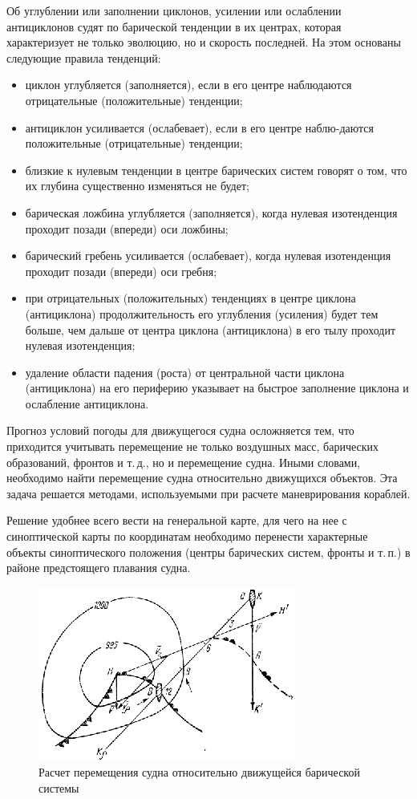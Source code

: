 \documentclass[a4paper, 12pt, twoside, final, book, russian, fittopage, cyremdash, openright]{ncc}
\begin{document}
Об углублении или заполнении циклонов, усилении или ослаблении
антициклонов судят по барической тенденции в их центрах, которая
характеризует не только эволюцию, но и скорость последней. На этом
основаны следующие правила тенденций:

\begin{itemize}
\item циклон углубляется (заполняется), если в его центре наблюдаются
  отрицательные (положительные) тенденции;
\item антициклон усиливается (ослабевает), если в его центре
  наблю-даются положительные (отрицательные) тенденции;
\item близкие к нулевым тенденции в центре барических систем говорят о
  том, что их глубина существенно изменяться не будет;
\item барическая ложбина углубляется (заполняется), когда нулевая
  изотенденция проходит позади (впереди) оси ложбины;
\item барический гребень усиливается (ослабевает), когда нулевая
  изотенденция проходит позади (впереди) оси гребня;
\item при отрицательных (положительных) тенденциях в центре циклона
  (антициклона) продолжительность его углубления (усиления) будет тем
  больше, чем дальше от центра циклона (антициклона) в его тылу
  проходит нулевая изотенденция;
\item удаление области падения (роста) от центральной части циклона
  (антициклона) на его периферию указывает на быстрое заполнение
  циклона и ослабление антициклона.
\end{itemize}

Прогноз условий погоды для движущегося судна осложняется тем, что
приходится учитывать перемещение не только воздушных масс, барических
образований, фронтов и т.\,д., но и перемещение судна. Иными словами,
необходимо найти перемещение судна относительно движущихся
объектов. Эта задача решается методами, используемыми при расчете
маневрирования кораблей.

Решение удобнее всего вести на генеральной карте, для чего на нее с
синоптической карты по координатам необходимо перенести характерные
объекты синоптического положения (центры барических систем, фронты и
т.\,п.) в районе предстоящего плавания судна.

\begin{figure}[htb]
   \centering
   \includegraphics[scale=3]{14_move_ship_a.eps}
   \caption{Расчет перемещения судна относительно движущейся барической системы}
   \label{fig:move_ship}
\end{figure}

\backmatter{}

\printindex
\end{document}
